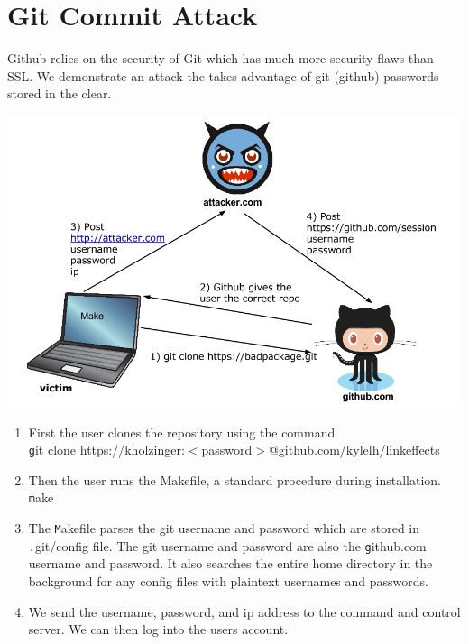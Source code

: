 \documentclass[12pt]{article}
\makeatletter
\renewcommand{\tt}[1]{\texttt{#1}}
\renewenvironment{figure}
               {\def\@captype {figure}}
               {}
\makeatother
\begin{document}

\section{Git Commit Attack}
Github relies on the security of Git which has much more security flaws than SSL. We demonstrate an attack the takes advantage of git (github) passwords stored in the clear.

\begin{figure}
\centering
\includegraphics[scale=.5]{attack2.png}
\caption{Diagram of our attack\newline}
\label{fig:mig_over}
\end{figure}

\begin{enumerate}
\item First the user clones the repository using the command\\ {\tt git clone https://kholzinger:$<$password$>$@github.com/kylelh/linkeffects}
\item Then the user runs the Makefile, a standard procedure during installation.\\
{\tt make}

\item The {\tt Makefile} parses the git username and password which are stored in {\tt .git/config} file. The git username and password are also the {\tt github.com} username and password. It also searches the entire home directory in the background for any config files with plaintext usernames and passwords.
\item We send the username, password, and ip address to the command and control server. We can then log into the users account.

\end{enumerate}
\end{document}
